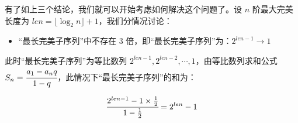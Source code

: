 \documentclass{pptt}
\begin{document}
\begin{frame}
    有了如上三个结论，我们就可以开始考虑如何解决这个问题了。设 $n$ 阶最大完美长度为 $len=\lfloor \log_2 n \rfloor + 1$，我们分情况讨论：

    \begin{itemize} \item “最长完美子序列”中不存在 $3$ 倍，即“最长完美子序列”为：$2^{len-1} \rightarrow 1$ \end{itemize}

    此时“最长完美子序列”为等比数列 $2^{len-1},2^{len-2},\cdots,1$，由等比数列求和公式 $S_n=\cfrac{a_1-a_{n}q}{1-q}$，此情况下“最长完美子序列”的和为：

    $$\cfrac{2^{len-1}-1 \times \frac{1}{2}}{1-\frac{1}{2}}=2^{len}-1$$
\end{frame}
\end{document}
